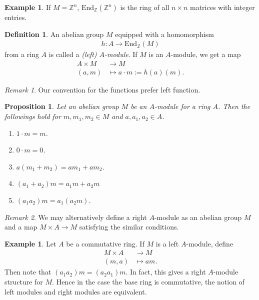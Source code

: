 \documentclass[12pt]{report}
\theoremstyle{plain}
\newtheorem{proposition}[theorem]{Proposition}
\theoremstyle{remark}
\newtheorem*{remark}{Remark}
\theoremstyle{definition}
\newtheorem{definition}[theorem]{Definition}
\newtheorem{example}[theorem]{Example}
\newcommand{\Z}{\mathbb{Z}}
\begin{document}
\begin{example}
    If $M=\Z^n$, $\mathrm{End}_\Z(\Z^n)$ is the ring of all $n\times n$ matrices with integer entries.
\end{example}

\begin{definition}
    An abelian group $M$ equipped with a homomorphism
    \begin{align*}
        h:A \rightarrow \mathrm{End}_\Z(M)
    \end{align*}
    from a ring $A$ is called a \emph{(left) $A$-module}. If $M$ is an $A$-module, we get a map
    \begin{align*}
        A\times M &\rightarrow M \\
        (a,m) &\mapsto a\cdot m := h(a)(m).
    \end{align*}
\end{definition}
\begin{remark}
    Our convention for the functions prefer left function.
\end{remark}

\begin{proposition}
    Let an abelian group $M$ be an $A$-module for a ring $A$. Then the followings hold for $m,m_1,m_2\in M$ and $a,a_1,a_2\in A$.
    \begin{enumerate}
        \item $1\cdot m = m$.
        \item $0\cdot m = 0$.
        \item $a(m_1+m_2) = am_1 + am_2$.
        \item $(a_1+a_2)m=a_1m+a_2m$
        \item $(a_1a_2)m=a_1(a_2m)$.
    \end{enumerate}
\end{proposition}
\begin{remark}
    We may alternatively define a right $A$-module as an abelian group $M$ and a map $M\times A\rightarrow M$ satisfying the similar conditions.
\end{remark}

\begin{example}
    Let $A$ be a commutative ring. If $M$ is a left $A$-module, define
    \begin{align*}
        M\times A &\rightarrow M \\
        (m,a) &\mapsto am.
    \end{align*}
    Then note that $(a_1a_2)m = (a_2a_1)m$. In fact, this gives a right $A$-module structure for $M$. Hence in the case the base ring is commutative, the notion of left modules and right modules are equivalent.
\end{example}
\end{document}
